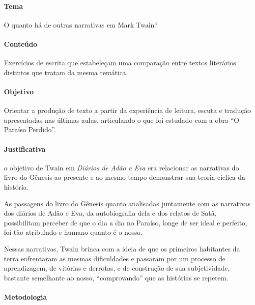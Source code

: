 \documentclass[12pt]{extarticle}
\begin{document}

\paragraph{Tema} O quanto há de outras narrativas em Mark Twain?

\paragraph{Conteúdo} Exercícios de escrita que estabeleçam uma comparação entre 
textos literários distintos que tratam da mesma temática.

\paragraph{Objetivo} Orientar a produção de texto a partir da experiência
de leitura, escuta e tradução apresentadas nas últimas
aulas, articulando o que foi estudado com a obra ``O Paraíso Perdido''.

\paragraph{Justificativa} o objetivo de Twain em \emph{Diários de Adão e Eva} era
relacionar as narrativas do livro do Gênesis ao presente e
ao mesmo tempo demonstrar sua teoria cíclica da história. 

As passagens do livro do Gênesis quanto analisadas juntamente com 
as narrativas dos diários de Adão e Eva, da autobiografia
dela e dos relatos de Satã, possibilitam perceber de que o dia a dia
no Paraíso, longe de ser ideal e perfeito, foi tão atribulado e
humano quanto é o nosso. 

Nessas narrativas, Twain brinca
com a ideia de que os primeiros habitantes da terra enfrentaram
as mesmas dificuldades e passaram por um processo
de aprendizagem, de vitórias e derrotas, e de construção de
sua subjetividade, bastante semelhante ao nosso, ``comprovando'' que as histórias 
se repetem.  

\paragraph{Metodologia}
\end{document}
